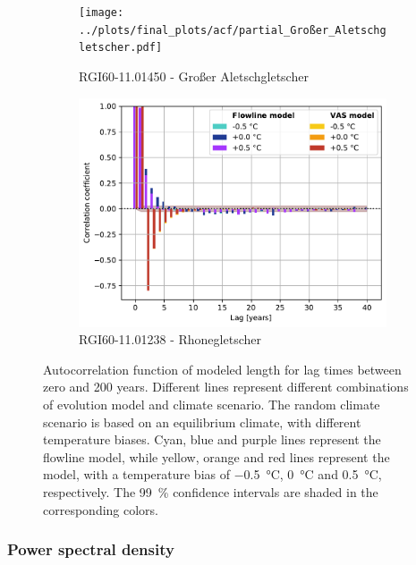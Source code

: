 \begin{figure}[htp]
        \begin{subfigure}[b]{0.48\textwidth}
          \caption{RGI60-11.01450 - Großer Aletschgletscher}
          \label{fig:acf:großer_aletschgletscher}
          \centering
          \texttt{[image: ../plots/final\_plots/acf/partial\_Großer\_Aletschgletscher.pdf]}
        \end{subfigure}
        \hfill
        \begin{subfigure}[b]{0.48\textwidth}
          \caption{RGI60-11.01238 - Rhonegletscher}
          \label{fig:acf:rhonegletscher}
          \centering
          \includegraphics[width=\textwidth]{../plots/final_plots/acf/partial_Rhonegletscher.pdf}
        \end{subfigure}

        \caption{Autocorrelation function of modeled length for lag times between zero and 200 years. Different lines represent different combinations of evolution model and climate scenario.
        The random climate scenario is based on an equilibrium climate, with different temperature biases.
        Cyan, blue and purple lines represent the flowline model, while yellow, orange and red lines represent the \vas{} model, with a temperature bias of \SI{-.5}{\celsius}, \SI{0}{\celsius} and \SI{+.5}{\celsius}, respectively.
        The \SI{99}{\percent} confidence intervals are shaded in the corresponding colors.}
        \label{fig:acf}
      \end{figure}


    \subsubsection{Power spectral density} %
    \label{ssub:power_spectral_density_results}
    
